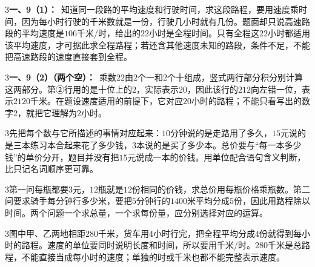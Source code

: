 \documentclass[multi=snippet,border={5bp 20bp 5bp 5bp}]{standalone}
\newenvironment{snippet}[3]{\begin{minipage}{#1bp}\color{answerred}\fontsize{#2}{#3}\selectfont\raggedright}{\end{minipage}}
\begin{document}
\begin{snippet}{505}{11.5}{14}\begin{multicols}{3}\raggedcolumns \textbf{一、9（1）：}\ 知道同一段路的平均速度和行驶时间，求这段路程，要用速度乘时间，因为每小时行驶的千米数就是一份，行驶几小时就有几份。题面却只说高速路段的平均速度是\(106\)\allowbreak 千米/时，给出的\(22\)\allowbreak 小时是全程时间。只有全程这\(22\)\allowbreak 小时都适用该平均速度，才可据此求全程路程；若还含其他速度未知的路段，条件不足，不能把高速路段的速度直接套到全程。\end{multicols}\end{snippet}
\begin{snippet}{505}{11.5}{14}\begin{multicols}{3}\raggedcolumns \textbf{一、9（2）（两个空）：}\ 乘数\(22\)\allowbreak 由\(2\)\allowbreak 个一和\(2\)\allowbreak 个十组成，竖式两行部分积分别计算这两部分。第②行用的是十位上的\(2\)\allowbreak ，实际表示\(20\)\allowbreak ，因此该行的\(212\)\allowbreak 向左错一位，表示\(2120\)\allowbreak 千米。在题设速度适用的前提下，它对应\(20\)\allowbreak 小时的路程；不能只看写出的数字\(2\)\allowbreak ，就把它理解为\(2\)\allowbreak 小时。\end{multicols}\end{snippet}
\begin{snippet}{505}{11.5}{14}\begin{multicols}{3}\raggedcolumns 先把每个数与它所描述的事情对应起来：\(10\)\allowbreak 分钟说的是走路用了多久，\(15\)\allowbreak 元说的是三本练习本合起来花了多少钱，\(3\)\allowbreak 本说的是买了多少本。总价要与“每一本多少钱”的单价分开，题目并没有把\(15\)\allowbreak 元说成一本的价钱。用单位配合语句含义判断，比只记名词顺序更可靠。\end{multicols}\end{snippet}
\begin{snippet}{505}{11.5}{14}\begin{multicols}{3}\raggedcolumns 第一问每瓶都要\(3\)\allowbreak 元，\(12\)\allowbreak 瓶就是\(12\)\allowbreak 份相同的价钱，求总价用每瓶价格乘瓶数。第二问要求骑手每分钟行多少米，要把\(5\)\allowbreak 分钟行的\(1400\)\allowbreak 米平均分成\(5\)\allowbreak 份，因此用路程除以时间。两个问题一个求总量，一个求每份量，应分别选择对应的运算。\end{multicols}\end{snippet}
\begin{snippet}{505}{11.5}{14}\begin{multicols}{3}\raggedcolumns 图中甲、乙两地相距\(280\)\allowbreak 千米，货车用\(4\)\allowbreak 小时行完，把全程平均分成\(4\)\allowbreak 份就得到每小时的路程。速度的单位要同时说明长度和时间，所以要用千米/时。\(280\)\allowbreak 千米是总路程，不能直接当成每小时的速度；单独的时或千米也都不能完整表示速度。\end{multicols}\end{snippet}
\end{document}
